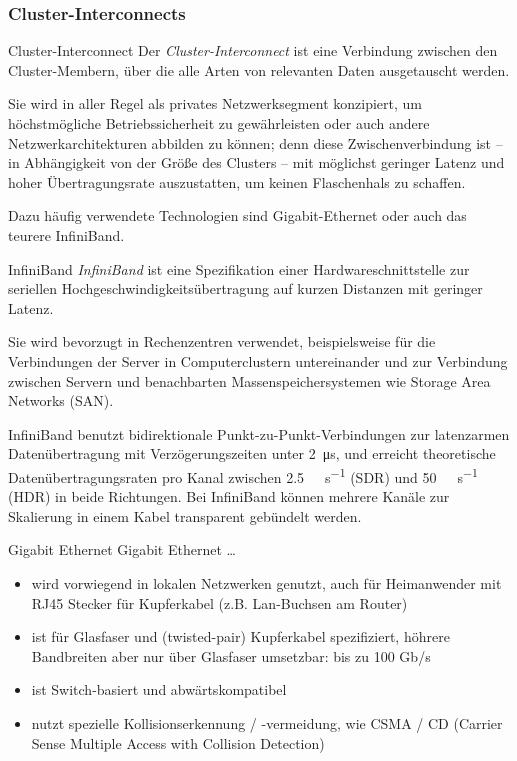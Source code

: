 \subsubsection{Cluster-Interconnects}

\begin{defi}{Cluster-Interconnect}
    Der \emph{Cluster-Interconnect} ist eine Verbindung zwischen den Cluster-Membern, über die alle Arten von relevanten Daten ausgetauscht werden.
    
    Sie wird in aller Regel als privates Netzwerksegment konzipiert, um höchstmögliche Betriebssicherheit zu gewährleisten oder auch andere Netzwerkarchitekturen abbilden zu können;
    denn diese Zwischenverbindung ist -- in Abhängigkeit von der Größe des Clusters -- mit möglichst geringer Latenz und hoher Übertragungsrate auszustatten, um keinen Flaschenhals zu schaffen.
    
    Dazu häufig verwendete Technologien sind Gigabit-Ethernet oder auch das teurere InfiniBand.
\end{defi}

\begin{defi}{InfiniBand}
    \emph{InfiniBand} ist eine Spezifikation einer Hardwareschnittstelle zur seriellen Hochgeschwindigkeitsübertragung auf kurzen Distanzen mit geringer Latenz.
    
    Sie wird bevorzugt in Rechenzentren verwendet, beispielsweise für die Verbindungen der Server in Computerclustern untereinander und zur Verbindung zwischen Servern und benachbarten Massenspeichersystemen wie Storage Area Networks (SAN).
    
    InfiniBand benutzt bidirektionale Punkt-zu-Punkt-Verbindungen zur latenzarmen Datenübertragung mit Verzögerungszeiten unter \SI{2}{\micro\second}, und erreicht theoretische Datenübertragungsraten pro Kanal zwischen \SI{2,5}{\giga\bit\per\second} (SDR) und \SI{50}{\giga\bit\per\second} (HDR) in beide Richtungen.
    Bei InfiniBand können mehrere Kanäle zur Skalierung in einem Kabel transparent gebündelt werden.
\end{defi}

\begin{defi}{Gigabit Ethernet}
    Gigabit Ethernet \ldots
    \begin{itemize}[\ldots]
        \item wird vorwiegend in lokalen Netzwerken genutzt,
              auch für Heimanwender mit RJ45 Stecker für Kupferkabel (z.B. Lan-Buchsen am Router)
        \item ist für Glasfaser und (twisted-pair) Kupferkabel spezifiziert,
              höhrere Bandbreiten aber nur über Glasfaser umsetzbar: bis zu 100 Gb/s
        \item ist Switch-basiert und abwärtskompatibel
        \item nutzt spezielle Kollisionserkennung / -vermeidung,
              wie CSMA / CD (Carrier Sense Multiple Access with Collision Detection)
    \end{itemize}
\end{defi}

